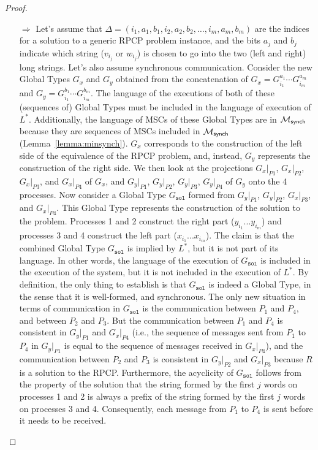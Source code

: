 \begin{proof}
	\begin{itemize}
		\item[$\Rightarrow$]
		      Let's assume that
		      $\Delta = (i_1, a_1, b_1, i_2, a_2, b_2, \ldots, i_m, a_m, b_m)$ are the indices
		      for a solution to a generic RPCP problem instance, and the bits $a_j$ and
		      $b_j$ indicate which string ($v_{i_j}$ or $w_{i_j}$) is chosen to go into
		      the two (left and right) long strings. Let's also assume synchronous communication.
			  Consider the new Global Types $G_x$ and $G_y$ obtained from the concatenation of
		      $G_x = G^{a_1}_{i_1} \cdots G^{a_m}_{i_m}$ 
			  and $G_y = G^{b_1}_{i_1} \cdots G^{b_m}_{i_m}$.
		      The language of the executions of both of these (sequences of) Global Types 
			  must be included in the language of execution of $L^*$. 
			  Additionally, the language of MSCs of these Global Types are 
			  in $\mathcal{M}_{\mathsf{synch}}$ because they are sequences of MSCs included in
			  $\mathcal{M}_{\mathsf{synch}}$ (Lemma~\ref{lemma:minsynch}).
		      $G_x$ corresponds to the construction of the left side of the equivalence of the RPCP
		      problem, and, instead, $G_y$ represents the construction of the right side.
		      We then look at the projections $G_x|_{P1}$, $G_x|_{P2}$, $G_x|_{P3}$,
		      and $G_x|_{P4}$ of $G_x$, and $G_y|_{P1}$, $G_y|_{P2}$, $G_y|_{P3}$, $G_y|_{P4}$ of $G_y$ onto the
		      4 processes. Now consider a Global Type $G_{\texttt{sol}}$ 
			  formed from $G_y|_{P1}$, $G_y|_{P2}$, $G_x|_{P3}$, and $G_x|_{P4}$.
		      This Global Type represents the construction of the solution to
		      the problem. Processes 1 and 2 construct the right part ($y_{i_1}...y_{i_m}$)
		      and processes 3 and 4 construct the left part ($x_{i_1}...x_{i_m}$).
		      The claim is that the combined Global Type $G_{\texttt{sol}}$ is 
		      implied by $L^*$, but it is not part of its language. 
			  In other words, the language of the execution of $G_{\texttt{sol}}$ is included
			  in the execution of the system, but it is not included in the execution of $L^*$. 
			  By definition, the only thing to establish is that $G_{\texttt{sol}}$
		      is indeed a Global Type, in the sense that it is well-formed,
		      and synchronous.
		      The only new situation in terms of communication in $G_{\texttt{sol}}$ is the
		      communication between $P_1$ and $P_4$, and between $P_2$ and $P_3$.
		      But the communication between $P_1$ and $P_4$ is consistent in
		      $G_y|_{P1}$ and $G_x|_{P4}$ (i.e., the sequence of messages sent from $P_1$ to
		      $P_4$ in $G_y|_{P1}$ is equal to the sequence of messages received in $G_x|_{P4}$),
		      and the communication between $P_2$ and $P_3$ is consistent in
		      $G_y|_{P2}$ and $G_x|_{P3}$ because $R$ is a solution to the RPCP.
		      Furthermore, the acyclicity of $G_{\texttt{sol}}$ follows from the property of the
		      solution that the string formed by the first $j$ words on processes 1
		      and 2 is always a prefix of the string formed by the first $j$ words
		      on processes 3 and 4. Consequently, each message from $P_1$ to $P_4$
		      is sent before it needs to be received.


\end{itemize}
\end{proof}
